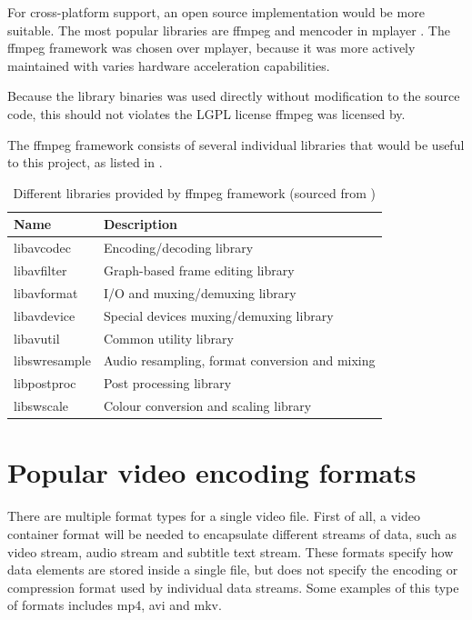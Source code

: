 For cross-platform support, an open source implementation would be more suitable. The most popular libraries are ffmpeg \cite{ffmpeg} and mencoder in mplayer \cite{mplayer}. The ffmpeg framework was chosen over mplayer, because it was more actively maintained with varies hardware acceleration capabilities.

Because the library binaries was used directly without modification to the source code, this should not violates the LGPL license ffmpeg was licensed by.

The ffmpeg framework consists of several individual libraries that would be useful to this project, as listed in .

\begin{table}[!h]
  \centering
  \begin{tabular}{l|l}
    \hline
    \textbf{Name} & \textbf{Description} \\
    \hline
    libavcodec & Encoding/decoding library  \\ \hline
    libavfilter & Graph-based frame editing library \\ \hline
    libavformat & I/O and muxing/demuxing library   \\ \hline
    libavdevice & Special devices muxing/demuxing library \\ \hline
    libavutil & Common utility library    \\ \hline
    libswresample & Audio resampling, format conversion and mixing  \\ \hline
    libpostproc & Post processing library \\ \hline
    libswscale & Colour conversion and scaling library  \\ \hline
  \end{tabular}
  \caption{Different libraries provided by ffmpeg framework (sourced from \cite{ffmpeg})}
  \label{tbl:ffmpeg}
\end{table}

\section{Popular video encoding formats}

There are multiple format types for a single video file. First of all, a video container format will be needed to encapsulate different streams of data, such as video stream, audio stream and subtitle text stream. These formats specify how data elements are stored inside a single file, but does not specify the encoding or compression format used by individual data streams. Some examples of this type of formats includes mp4, avi and mkv.

